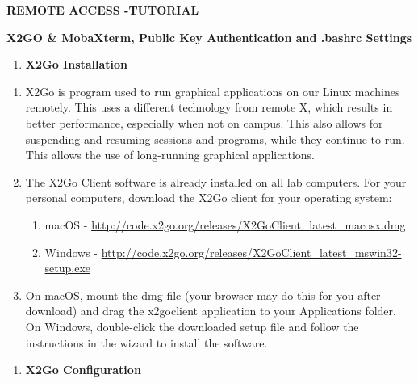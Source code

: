 \documentclass[
]{article}
\author{}
\date{}
\begin{document}
\textbf{REMOTE ACCESS -TUTORIAL}

\textbf{X2GO \& MobaXterm, Public Key Authentication and .bashrc
Settings}

\begin{enumerate}
\def\labelenumi{\Alph{enumi}.}
\item
  \textbf{X2Go Installation}
\end{enumerate}

\begin{enumerate}
\def\labelenumi{\arabic{enumi}.}
\item
  X2Go is program used to run graphical applications on our Linux
  machines remotely. This uses a different technology from remote X,
  which results in better performance, especially when not on campus.
  This also allows for suspending and resuming sessions and programs,
  while they continue to run. This allows the use of long-running
  graphical applications.
\item
  The X2Go Client software is already installed on all lab computers.
  For your personal computers, download the X2Go client for your
  operating system:

  \begin{enumerate}
  \def\labelenumii{\arabic{enumii}.}
  \item
    macOS -
    \url{http://code.x2go.org/releases/X2GoClient_latest_macosx.dmg}
  \item
    Windows -
    \url{http://code.x2go.org/releases/X2GoClient_latest_mswin32-setup.exe}
  \end{enumerate}
\item
  On macOS, mount the dmg file (your browser may do this for you after
  download) and drag the x2goclient application to your Applications
  folder. On Windows, double-click the downloaded setup file and follow
  the instructions in the wizard to install the software.
\end{enumerate}

\begin{enumerate}
\def\labelenumi{\Alph{enumi}.}
\setcounter{enumi}{1}
\item
  \textbf{X2Go Configuration}
\end{enumerate}
\end{document}
